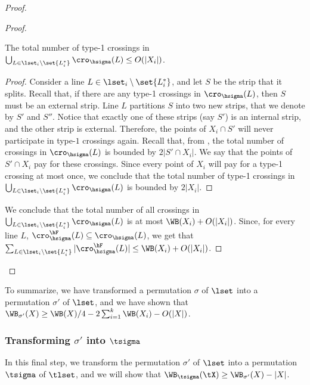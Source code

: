 \begin{proof}
\begin{proof}
		
		\begin{myobs}\label{obs: type 1 crossings}
			The total number of type-1 crossings in $\bigcup_{L\in \lset_i\setminus\set{L_i^*}}\cro_{\hsigma}(L)\leq O(|X_i|)$.
		\end{myobs}
		\begin{proof}
			Consider a line $L\in \lset_i\setminus\set{L_i^*}$, and let $S$ be the strip that it splits. Recall that, if there are any type-1 crossings in $\cro_{\hsigma}(L)$, then $S$ must be an external strip. Line $L$ partitions $S$ into two new strips, that we denote by $S'$ and $S''$. Notice that exactly one of these strips (say $S'$) is an internal strip, and the other strip is external. Therefore, the points of $X_i\cap S'$ will never participate in type-$1$ crossings again. Recall that, from , the total number of crossings in $\cro_{\hsigma}(L)$ is bounded by $2|S'\cap X_i|$. We say that the points of $S'\cap X_i$ pay for these crossings. Since every point of $X_i$ will pay for a type-1 crossing at most once, we conclude that the total number of type-1 crossings in $\bigcup_{L\in \lset_i\setminus\set{L_i^*}}\cro_{\hsigma}(L)$ is bounded by $2|X_i|$.
		\end{proof}
		
		We conclude that the total number of all crossings in $\bigcup_{L\in \lset_i\setminus\set{L_i^*}}\cro_{\hsigma}(L)$ is at most $\WB(X_i)+O(|X_i|)$. Since, for every line $L$, $\cro_{\hsigma}^{\hF}(L)\subseteq \cro_{\hsigma}(L)$, we get that $\sum_{L\in \lset_i\setminus\set{L_i^*}}|\cro^{\hF}_{\hsigma}(L)|\leq \WB(X_i)+O(|X_i|)$.
	\end{proof}			
\end{proof}


To summarize, we have transformed a permutation $\sigma$ of $\lset$ into a permutation $\sigma'$ of $\lset$, and we have shown that  $\WB_{\sigma'}(X)\geq \WB(X)/4-2\sum_{i=1}^k\WB(X_i)-O(|X|)$.


\subsubsection{Transforming $\sigma'$ into $\tsigma$}


In this final step, we transform the permutation $\sigma'$ of $\lset$ into a permutation $\tsigma$ of $\tlset$, and we will show that $\WB_{\tsigma}(\tX)\geq \WB_{\sigma'}(X)-|X|$.

